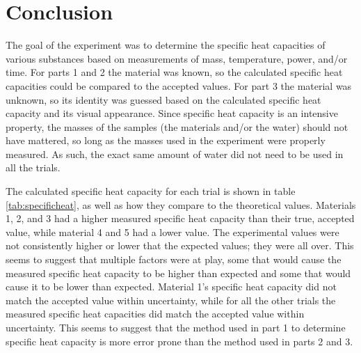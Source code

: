 \documentclass[12pt]{iopart} %
\begin{document}
\section{Conclusion}

The goal of the experiment was to determine the specific heat capacities of various substances based on measurements of mass, temperature, power, and/or time.
For parts 1 and 2 the material was known, so the calculated specific heat capacities could be compared to the accepted values.
For part 3 the material was unknown, so its identity was guessed based on the calculated specific heat capacity and its visual appearance.
Since specific heat capacity is an intensive property, the masses of the samples (the materials and/or the water) should not have mattered, so long as the masses used in the experiment were properly measured.
As such, the exact same amount of water did not need to be used in all the trials.

The calculated specific heat capacity for each trial is shown in table \ref{tab:specificheat}, as well as how they compare to the theoretical values.
Materials 1, 2, and 3 had a higher measured specific heat capacity than their true, accepted value, while material 4 and 5 had a lower value.
The experimental values were not consistently higher or lower that the expected values; they were all over.
This seems to suggest that multiple factors were at play, some that would cause the measured specific heat capacity to be higher than expected and some that would cause it to be lower than expected.
Material 1's specific heat capacity did not match the accepted value within uncertainty, while for all the other trials the measured specific heat capacities did match the accepted value within uncertainty.
This seems to suggest that the method used in part 1 to determine specific heat capacity is more error prone than the method used in parts 2 and 3.
\end{document}
